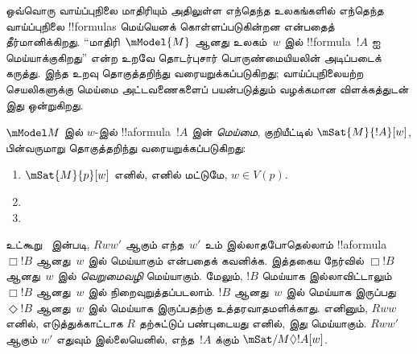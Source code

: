 \documentclass[../../../include/open-logic-section]{subfiles}
\begin{document}


ஒவ்வொரு வாய்ப்புநிலை மாதிரியும் அதிலுள்ள எந்தெந்த உலகங்களில் எந்தெந்த
வாய்ப்புநிலை !!{formula}s மெய்யெனக் கொள்ளப்படுகின்றன என்பதைத்
தீர்மானிக்கிறது. ``மாதிரி~$\mModel{M}$ ஆனது உலகம்~$w$ இல்
!!{formula}~$!A$ ஐ மெய்யாக்குகிறது'' என்ற உறவே தொடர்புசார்
பொருண்மையியலின் அடிப்படைக் கருத்து. இந்த உறவு தொகுத்தறிந்து
வரையறுக்கப்படுகிறது; வாய்ப்புநிலையற்ற செயலிகளுக்கு மெய்மை அட்டவணைகளைப்
பயன்படுத்தும் வழக்கமான விளக்கத்துடன் இது ஒன்றுகிறது.

\begin{defn}
  $\mModel M$ இல் $w$-இல் !!a{formula}~$!A$ இன் \emph{மெய்மை},
  குறியீட்டில் $\mSat{M}{!A}[w]$, பின்வருமாறு தொகுத்தறிந்து
  வரையறுக்கப்படுகிறது:
  \begin{enumerate}
  \item $\mSat{M}{p}[w]$ எனில், எனில் மட்டுமே, $w \in V(p)$.
  \item{}
  \item{}
  \end{enumerate}
\end{defn}

உட்கூறு~ இன்படி, $Rww'$ ஆகும் எந்த~$w'$ உம்
இல்லாதபோதெல்லாம் !!a{formula}~$\Box !B$ ஆனது~$w$ இல் மெய்யாகும் என்பதைக்
கவனிக்க. இத்தகைய நேர்வில் $\Box !B$ ஆனது~$w$ இல் \emph{வெறுமைவழி}
மெய்யாகும். மேலும், $!B$ மெய்யாக இல்லாவிட்டாலும் $\Box !B$ ஆனது~$w$ இல்
நிறைவுறுத்தப்படலாம். $!B$ ஆனது~$w$ இல் மெய்யாக இருப்பது $\Diamond !B$
ஆனது~$w$ இல் மெய்யாக இருப்பதற்கு உத்தரவாதமளிக்காது. எனினும், $Rww$
எனில், எடுத்துக்காட்டாக $R$ தற்சுட்டுப் பண்புடையது எனில், இது மெய்யாகும். $Rww'$
ஆகும் $w'$ எதுவும் இல்லையெனில், எந்த~$!A$ க்கும்
$\mSat/{M}{\Diamond !A}[w]$.
\end{document}
